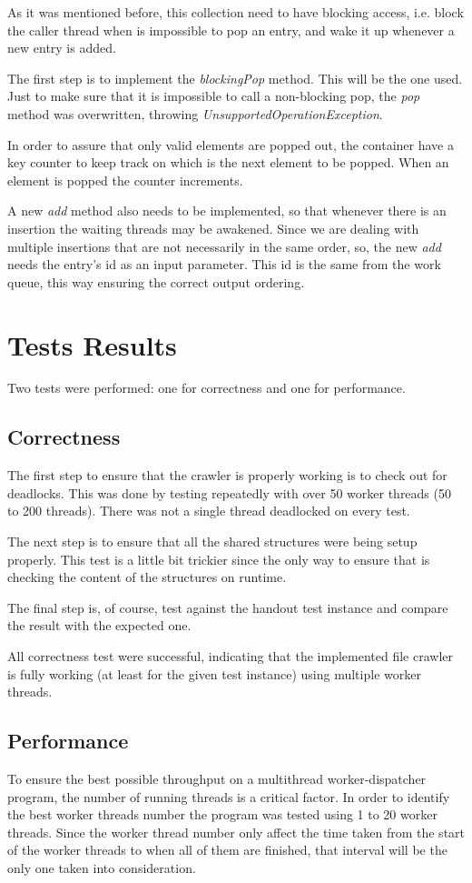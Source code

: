 \documentclass[twocolumn,20pt]{article}
\begin{document}
As it was mentioned before, this collection need to have blocking access, i.e. block the caller thread when is impossible to pop an entry, and wake it up whenever a new entry is added.

The first step is to implement the \textit{blockingPop} method. This will be the one used. Just to make sure that it is impossible to call a non-blocking pop, the \textit{pop} method was overwritten, throwing \textit{UnsupportedOperationException}.

In order to assure that only valid elements are popped out, the container have a key counter to keep track on which is the next element to be popped. When an element is popped the counter increments.

A new \textit{add} method also needs to be implemented, so that whenever there is an insertion the waiting threads may be awakened. Since we are dealing with multiple insertions that are not necessarily in the same order, so, the new \textit{add} needs the entry's id as an input parameter. This id is the same from the work queue, this way ensuring the correct output ordering.

\section{Tests Results}
Two tests were performed: one for correctness and one for performance.
\subsection{Correctness}
The first step to ensure that the crawler is properly working is to check out for deadlocks. This was done by testing repeatedly with over 50 worker threads (50 to 200 threads). There was not a single thread deadlocked on every test.

The next step is to ensure that all the shared structures were being setup properly. This test is a little bit trickier since the only way to ensure that is checking the content of the structures on runtime.

The final step is, of course, test against the handout test instance and compare the result with the expected one.

All correctness test were successful, indicating that the implemented file crawler is fully working (at least for the given test instance) using multiple worker threads.

\subsection{Performance}
To ensure the best possible throughput on a multithread worker-dispatcher program, the number of running threads is a critical factor. In order to identify the best worker threads number the program was tested using 1 to 20 worker threads. Since the worker thread number only affect the time taken from the start of the worker threads to when all of them are finished, that interval will be the only one taken into consideration.
\end{document}
